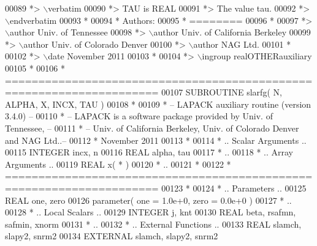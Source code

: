 \begin{DoxyCode}
00089 \textcolor{comment}{*> \(\backslash\)verbatim}
00090 \textcolor{comment}{*>          TAU is REAL}
00091 \textcolor{comment}{*>          The value tau.}
00092 \textcolor{comment}{*> \(\backslash\)endverbatim}
00093 \textcolor{comment}{*}
00094 \textcolor{comment}{*  Authors:}
00095 \textcolor{comment}{*  ========}
00096 \textcolor{comment}{*}
00097 \textcolor{comment}{*> \(\backslash\)author Univ. of Tennessee }
00098 \textcolor{comment}{*> \(\backslash\)author Univ. of California Berkeley }
00099 \textcolor{comment}{*> \(\backslash\)author Univ. of Colorado Denver }
00100 \textcolor{comment}{*> \(\backslash\)author NAG Ltd. }
00101 \textcolor{comment}{*}
00102 \textcolor{comment}{*> \(\backslash\)date November 2011}
00103 \textcolor{comment}{*}
00104 \textcolor{comment}{*> \(\backslash\)ingroup realOTHERauxiliary}
00105 \textcolor{comment}{*}
00106 \textcolor{comment}{*  =====================================================================}
00107 \textcolor{keyword}{      SUBROUTINE }slarfg( N, ALPHA, X, INCX, TAU )
00108 \textcolor{comment}{*}
00109 \textcolor{comment}{*  -- LAPACK auxiliary routine (version 3.4.0) --}
00110 \textcolor{comment}{*  -- LAPACK is a software package provided by Univ. of Tennessee,    --}
00111 \textcolor{comment}{*  -- Univ. of California Berkeley, Univ. of Colorado Denver and NAG Ltd..--}
00112 \textcolor{comment}{*     November 2011}
00113 \textcolor{comment}{*}
00114 \textcolor{comment}{*     .. Scalar Arguments ..}
00115       \textcolor{keywordtype}{INTEGER}            incx, n
00116       \textcolor{keywordtype}{REAL}               alpha, tau
00117 \textcolor{comment}{*     ..}
00118 \textcolor{comment}{*     .. Array Arguments ..}
00119       \textcolor{keywordtype}{REAL}               x( * )
00120 \textcolor{comment}{*     ..}
00121 \textcolor{comment}{*}
00122 \textcolor{comment}{*  =====================================================================}
00123 \textcolor{comment}{*}
00124 \textcolor{comment}{*     .. Parameters ..}
00125       \textcolor{keywordtype}{REAL}               one, zero
00126       parameter( one = 1.0e+0, zero = 0.0e+0 )
00127 \textcolor{comment}{*     ..}
00128 \textcolor{comment}{*     .. Local Scalars ..}
00129       \textcolor{keywordtype}{INTEGER}            j, knt
00130       \textcolor{keywordtype}{REAL}               beta, rsafmn, safmin, xnorm
00131 \textcolor{comment}{*     ..}
00132 \textcolor{comment}{*     .. External Functions ..}
00133       \textcolor{keywordtype}{REAL}               slamch, slapy2, snrm2
00134       \textcolor{keywordtype}{EXTERNAL}           slamch, slapy2, snrm2

\end{DoxyCode}
